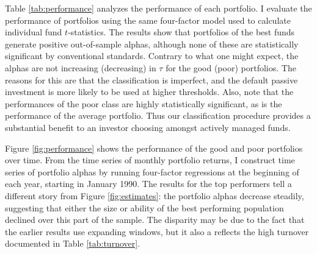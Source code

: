 Table \ref{tab:performance} analyzes the performance of each portfolio. I evaluate the performance of portfolios using the same four-factor model used to calculate individual fund $t$-statistics.  The results show that portfolios of the best funds generate positive out-of-sample alphas, although none of these are statistically significant by conventional standards.  Contrary to what one might expect, the alphas are not increasing (decreasing) in $\tau$ for the good (poor) portfolios.  The reasons for this are that the classification is imperfect, and the default passive investment is more likely to be used at higher thresholds. Also, note that the performances of the poor class are highly statistically significant, as is the performance of the average portfolio.  Thus our classification procedure provides a substantial benefit to an investor choosing amongst actively managed funds.

Figure \ref{fig:performance} shows the performance of the good and poor portfolios over time. From the time series of monthly portfolio returns, I construct time series of portfolio alphas by running four-factor regressions at the beginning of each year, starting in January 1990.  The results for the top performers tell a different story from Figure \ref{fig:estimates}: the portfolio alphas decrease steadily, suggesting that either the size or ability of the best performing population declined over this part of the sample.  The disparity may be due to the fact that the earlier results use expanding windows, but it also a reflects the high turnover documented in Table \ref{tab:turnover}.


